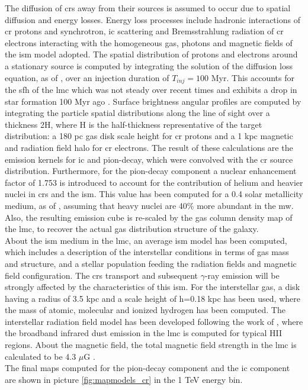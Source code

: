 \documentclass[main.tex]{subfiles}
\begin{document}
The diffusion of \glspl{cr} away from their sources is assumed to occur due to spatial diffusion and energy losses. Energy loss processes include hadronic interactions of \gls{cr} protons and synchrotron, \gls{ic} scattering and Bremsstrahlung radiation of \gls{cr} electrons interacting with the homogeneous gas, photons and magnetic fields of the \gls{ism} model adopted. The spatial distribution of protons and electrons around a stationary source is computed by integrating the solution of the diffusion loss equation, as of \cite{2006diffusionloss}, over an injection duration of $T_{inj} = 100$ Myr. This accounts for the \gls{sfh} of the \gls{lmc} which was not steady over recent times and exhibits a drop in star formation 100 Myr ago \cite{2009SFHofLMC}. Surface brightness angular profiles are computed by integrating the particle spatial distributions along the line of sight over a thickness 2H, where H is the half-thickness representative of the target distribution: a 180 pc gas disk scale height for \gls{cr} protons and a 1 kpc magnetic and radiation field halo for \gls{cr} electrons. The result of these calculations are the emission kernels for \gls{ic} and pion-decay, which were convolved with the \gls{cr} source distribution. Furthermore, for the pion-decay component a nuclear enhancement factor of 1.753 is introduced to account for the contribution of helium and heavier nuclei in \glspl{cr} and the \gls{ism}. This value has been computed for a 0.4 solar metallicity medium, as of \cite{2009nuclerenhancement}, assuming that heavy nuclei are 40\% more abundant in the \gls{mw}. Also, the resulting emission cube is re-scaled by the gas column density map of the \gls{lmc}, to recover the actual gas distribution structure of the galaxy.\\
About the \gls{ism} medium in the \gls{lmc}, an average \gls{ism} model has been computed, which includes a description of the interstellar conditions in terms of gas mass and structure, and a stellar population feeding the radiation fields and magnetic field configuration. The \glspl{cr} transport and subsequent $\gamma$-ray emission will be strongly affected by the characteristics of this \gls{ism}. For the interstellar gas, a disk having a radius of 3.5 kpc and a scale height of h=0.18 kpc has been used, where the mass of atomic, molecular and ionized hydrogen has been computed. The interstellar radiation field model has been developed following the work of \cite{2014DustEMLMCismemission}, where the broadband infrared dust emission in the \gls{lmc} is computed for typical HII regions. About the magnetic field, the total magnetic field strength in the \gls{lmc} is calculated to be 4.3 $\mu$G \cite{2005LMCmagneticfield}.\\
The final maps computed for the pion-decay component and the \gls{ic} component are shown in picture \ref{fig:mapmodels_cr} in the 1 TeV energy bin.
\end{document}
